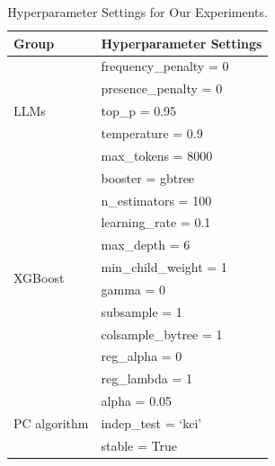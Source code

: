 \begin{table}[htbp]
\centering
\caption{Hyperparameter Settings for Our Experiments.}
\label{tab:hyperparameters}
\begin{tabular}{ll}
    \toprule
    \textbf{Group} & \textbf{Hyperparameter Settings} \\
    \midrule
    \multirow{5}{*}{LLMs} & frequency\_penalty = 0 \\
    & presence\_penalty = 0 \\
    & top\_p = 0.95 \\
    & temperature = 0.9 \\
    & max\_tokens = 8000 \\
    \midrule
    \multirow{10}{*}{XGBoost} & booster = gbtree \\
    & n\_estimators = 100 \\
    & learning\_rate = 0.1 \\
    & max\_depth = 6 \\
    & min\_child\_weight = 1 \\
    & gamma = 0 \\
    & subsample = 1 \\
    & colsample\_bytree = 1 \\
    & reg\_alpha = 0 \\
    & reg\_lambda = 1 \\
    \midrule
    \multirow{3}{*}{PC algorithm} & alpha = 0.05 \\
    & indep\_test = `kci' \\
    & stable = True \\
    \bottomrule
\end{tabular}
\end{table}


